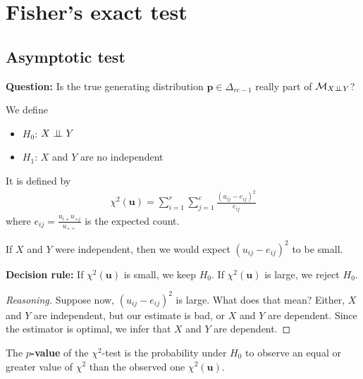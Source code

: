 \section{Fisher's exact test}

\subsection{Asymptotic test}

\textbf{Question:} Is the true generating distribution \( \mathbf p\in \Delta_{rc - 1} \) really part of \( \mathcal{M}_{X \perp \!\!\! \perp Y} \)?

We define 
\begin{itemize}
  \item \( H_0 \): \( X  \perp \!\!\! \perp Y\)
  \item \( H_1 \): \( X \) and \( Y \) are no independent
\end{itemize}

\begin{defi}
  It is defined by 
  \begin{align*}
    \chi^2(\mathbf u) = \sum^r_{i=1} \sum^c_{j=1} \frac{(u_{ij} - e_{ij})^2}{e_{ij}}
  \end{align*}
  where \( e_{ij} = \frac{u_{i+} u_{+j}}{u_{++}} \) is the expected count.
\end{defi}

\begin{remark}
  If \( X \) and \( Y \) were independent, then we would expect \( (u_{ij} - e_{ij})^2 \) to be small.
\end{remark}

\begin{mdframed}
  \textbf{Decision rule: }
If \( \chi^2(\mathbf u) \) is small, we keep \( H_0 \). If \( \chi^2(\mathbf u) \) is large, we reject \( H_0 \).
\end{mdframed}

\begin{proof}[Reasoning]
 Suppose now, \( (u_{ij} - e_{ij})^2 \) is large. What does that mean? Either, \( X \) and \( Y \) are independent, but our estimate is bad, or \( X \) and \( Y \) are dependent. Since the estimator is optimal, we infer that \( X \) and \( Y \) are dependent.
\end{proof}


\begin{defi}[p-value]
  The \( p \)\textbf{-value} of the \( \chi^2 \)-test is the probability under \( H_0 \) to observe an equal or greater value of \( \chi^2 \) than the observed one \( \chi^2(\mathbf u) \).
\end{defi}

